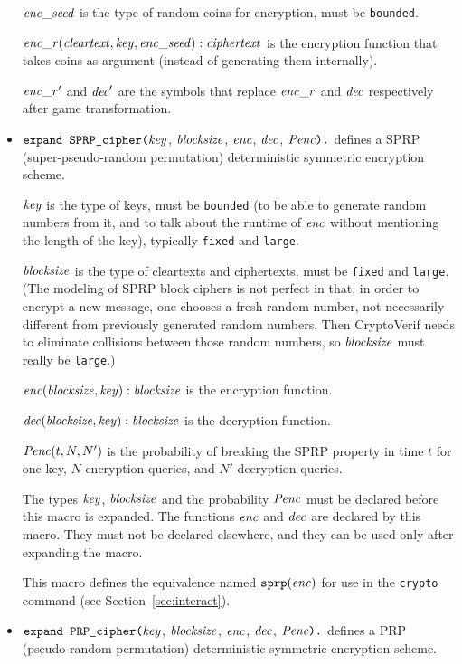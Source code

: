 \documentclass{article}
\begin{document}
\begin{itemize}
  $\mathit{enc\_seed}$ is the type of random coins for encryption, must be \texttt{bounded}.

  $\mathit{enc\_r}(\mathit{cleartext}, \mathit{key}, \mathit{enc\_seed}): \mathit{ciphertext}$ is the encryption function that takes coins as argument (instead of generating them internally).

  $\mathit{enc\_r}'$ and $\mathit{dec}'$ are the symbols that replace $\mathit{enc\_r}$ and $\mathit{dec}$ respectively after game transformation.


\item $\texttt{expand SPRP\_cipher(}\mathit{key}$,
$  \mathit{blocksize}$, $\mathit{enc}$, $\mathit{dec}$, $\mathit{Penc}\texttt{).}$
  defines a SPRP (super-pseudo-random permutation) deterministic
  symmetric encryption scheme.

   $\mathit{key}$ is the type of keys, must be \texttt{bounded} (to be able to generate random numbers from it, and to talk about the runtime of $\mathit{enc}$ without mentioning the length of the key), typically \texttt{fixed} and \texttt{large}.

   $\mathit{blocksize}$ is the type of cleartexts and ciphertexts, 
   must be \texttt{fixed} and \texttt{large}.
   (The modeling of SPRP block ciphers is not perfect in that, in
   order to encrypt a new message, one chooses a fresh random number,
   not necessarily different from previously generated random
   numbers. Then CryptoVerif needs to eliminate collisions between
   those random numbers, so $\mathit{blocksize}$ must really be
   \texttt{large}.)

   $\mathit{enc}(\mathit{blocksize}, \mathit{key}): \mathit{blocksize}$ is the encryption function.

   $\mathit{dec}(\mathit{blocksize}, \mathit{key}): \mathit{blocksize}$ is the
  decryption function.

  $\mathit{Penc}(t, N, N')$ is the probability of breaking the SPRP
  property in time $t$ for one key, $N$ encryption queries, and $N'$
  decryption queries.

  The types $\mathit{key}$, $\mathit{blocksize}$ and the
  probability $\mathit{Penc}$ must be declared before this macro is
  expanded. The functions $\mathit{enc}$ and $\mathit{dec}$ are
  declared by this macro. They must not be declared elsewhere, and
  they can be used only after expanding the macro.

   This macro defines the equivalence named $\texttt{sprp}(\mathit{enc})$
   for use in the \texttt{crypto} command 
   (see Section~\ref{sec:interact}).

\item $\texttt{expand PRP\_cipher(}\mathit{key}$,
$  \mathit{blocksize}$, $\mathit{enc}$, $\mathit{dec}$, $\mathit{Penc}\texttt{).}$
  defines a PRP (pseudo-random permutation) deterministic
  symmetric encryption scheme.


\end{itemize}
\end{document}

